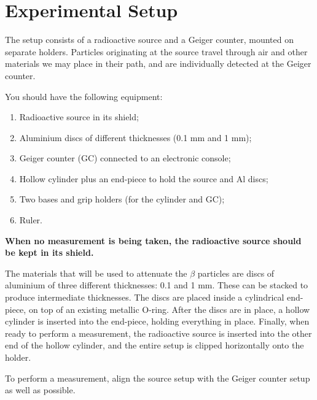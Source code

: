 \section{Experimental Setup}

The setup consists of a radioactive source and a Geiger counter, mounted on separate holders. Particles originating at the source travel through air and other materials we may place in their path, and are individually detected at the Geiger counter.

You should have the following equipment:
\begin{enumerate}
\item{Radioactive source in its shield;}
\item{Aluminium discs of different thicknesses (0.1 mm and 1 mm);}
\item{Geiger counter (GC) connected to an electronic console;}
\item{Hollow cylinder plus an end-piece to hold the source and Al discs;}
\item{Two bases and grip holders (for the cylinder and GC);}
\item{Ruler.}
\end{enumerate}

\textbf{When no measurement is being taken, the radioactive source should be kept in its shield.}

The materials that will be used to attenuate the $\beta$ particles are discs of aluminium of three different thicknesses: 0.1 and 1 mm. These can be stacked to produce intermediate thicknesses. The discs are placed inside a cylindrical end-piece, on top of an existing metallic O-ring. After the discs are in place, a hollow cylinder is inserted into the end-piece, holding everything in place. Finally, when ready to perform a measurement, the radioactive source is inserted into the other end of the hollow cylinder, and the entire setup is clipped horizontally onto the holder.

To perform a measurement, align the source setup with the Geiger counter setup as well as possible.